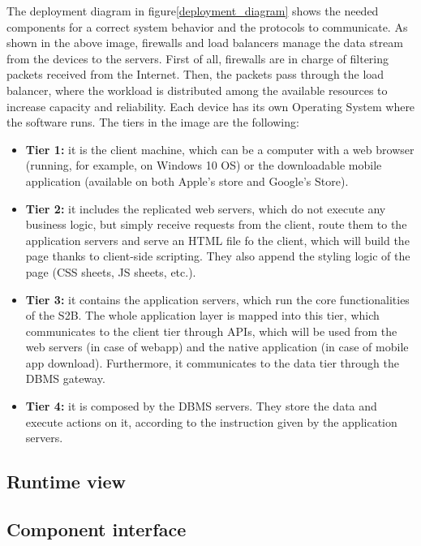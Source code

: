 The deployment diagram in figure\ref{deployment_diagram} shows the needed components for a correct system behavior and the protocols to communicate. As shown in the above image, firewalls and load balancers manage the data stream
from the devices to the servers. First of all, firewalls are in charge of filtering packets
received from the Internet. Then, the packets pass through the load balancer, where
the workload is distributed among the available resources to increase capacity and
reliability.
Each device has its own Operating System where the software runs.
The tiers in the image are the following:
\begin{itemize}
    \item \textbf{Tier 1:} it is the client machine, which can be a computer with a web browser (running, for example, on Windows 10 OS) or the downloadable mobile application (available on both Apple's store and Google's Store).
    \item \textbf{Tier 2:} it includes the replicated web servers, which do not execute any business logic, but simply receive requests from the client, route them to the application servers and serve an HTML file fo the client, which will build the page thanks to client-side scripting. They also append the styling logic of the page (CSS sheets, JS sheets, etc.).
    \item \textbf{Tier 3:} it contains the application servers, which run the core functionalities of the S2B. The whole application layer is mapped into this tier, which communicates to the client tier through APIs, which will be used from the web servers (in case of webapp) and the native application (in case of mobile app download). Furthermore, it communicates to the data tier through the DBMS gateway.
    \item \textbf{Tier 4:} it is composed by the DBMS servers. They store the data and execute actions on it, according to the instruction given by the application servers.
\end{itemize}
\subsection{Runtime view}
\subsection{Component interface}



